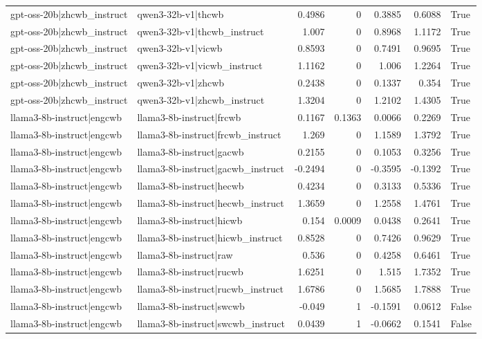 \begin{table}
\begin{tabular}{l l r r r r l}
gpt-oss-20b|zhcwb_instruct & qwen3-32b-v1|thcwb & 0.4986 & 0 & 0.3885 & 0.6088 & True \\
gpt-oss-20b|zhcwb_instruct & qwen3-32b-v1|thcwb_instruct & 1.007 & 0 & 0.8968 & 1.1172 & True \\
gpt-oss-20b|zhcwb_instruct & qwen3-32b-v1|vicwb & 0.8593 & 0 & 0.7491 & 0.9695 & True \\
gpt-oss-20b|zhcwb_instruct & qwen3-32b-v1|vicwb_instruct & 1.1162 & 0 & 1.006 & 1.2264 & True \\
gpt-oss-20b|zhcwb_instruct & qwen3-32b-v1|zhcwb & 0.2438 & 0 & 0.1337 & 0.354 & True \\
gpt-oss-20b|zhcwb_instruct & qwen3-32b-v1|zhcwb_instruct & 1.3204 & 0 & 1.2102 & 1.4305 & True \\
llama3-8b-instruct|engcwb & llama3-8b-instruct|frcwb & 0.1167 & 0.1363 & 0.0066 & 0.2269 & True \\
llama3-8b-instruct|engcwb & llama3-8b-instruct|frcwb_instruct & 1.269 & 0 & 1.1589 & 1.3792 & True \\
llama3-8b-instruct|engcwb & llama3-8b-instruct|gacwb & 0.2155 & 0 & 0.1053 & 0.3256 & True \\
llama3-8b-instruct|engcwb & llama3-8b-instruct|gacwb_instruct & -0.2494 & 0 & -0.3595 & -0.1392 & True \\
llama3-8b-instruct|engcwb & llama3-8b-instruct|hecwb & 0.4234 & 0 & 0.3133 & 0.5336 & True \\
llama3-8b-instruct|engcwb & llama3-8b-instruct|hecwb_instruct & 1.3659 & 0 & 1.2558 & 1.4761 & True \\
llama3-8b-instruct|engcwb & llama3-8b-instruct|hicwb & 0.154 & 0.0009 & 0.0438 & 0.2641 & True \\
llama3-8b-instruct|engcwb & llama3-8b-instruct|hicwb_instruct & 0.8528 & 0 & 0.7426 & 0.9629 & True \\
llama3-8b-instruct|engcwb & llama3-8b-instruct|raw & 0.536 & 0 & 0.4258 & 0.6461 & True \\
llama3-8b-instruct|engcwb & llama3-8b-instruct|rucwb & 1.6251 & 0 & 1.515 & 1.7352 & True \\
llama3-8b-instruct|engcwb & llama3-8b-instruct|rucwb_instruct & 1.6786 & 0 & 1.5685 & 1.7888 & True \\
llama3-8b-instruct|engcwb & llama3-8b-instruct|swcwb & -0.049 & 1 & -0.1591 & 0.0612 & False \\
llama3-8b-instruct|engcwb & llama3-8b-instruct|swcwb_instruct & 0.0439 & 1 & -0.0662 & 0.1541 & False \\

\end{tabular}
\end{table}
